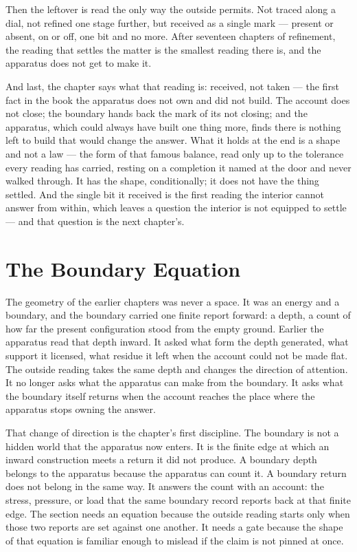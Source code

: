 Then the leftover is read the only way the outside permits. Not traced along a dial, not refined one stage further, but received as a single mark --- present or absent, on or off, one bit and no more. After seventeen chapters of refinement, the reading that settles the matter is the smallest reading there is, and the apparatus does not get to make it.

And last, the chapter says what that reading is: received, not taken --- the first fact in the book the apparatus does not own and did not build. The account does not close; the boundary hands back the mark of its not closing; and the apparatus, which could always have built one thing more, finds there is nothing left to build that would change the answer. What it holds at the end is a shape and not a law --- the form of that famous balance, read only up to the tolerance every reading has carried, resting on a completion it named at the door and never walked through. It has the shape, conditionally; it does not have the thing settled. And the single bit it received is the first reading the interior cannot answer from within, which leaves a question the interior is not equipped to settle --- and that question is the next chapter's.

\section{The Boundary Equation}

The geometry of the earlier chapters was never a space. It was an energy and a boundary, and the
boundary carried one finite report forward: a depth, a count of how far the present configuration
stood from the empty ground. Earlier the apparatus read that depth inward. It asked what form the
depth generated, what support it licensed, what residue it left when the account could not be made
flat. The outside reading takes the same depth and changes the direction of attention. It no
longer asks what the apparatus can make from the boundary. It asks what the boundary itself
returns when the account reaches the place where the apparatus stops owning the answer.

That change of direction is the chapter's first discipline. The boundary is not a hidden world
that the apparatus now enters. It is the finite edge at which an inward construction meets a
return it did not produce. A boundary depth belongs to the apparatus because the apparatus can
count it. A boundary return does not belong in the same way. It answers the count with an account:
the stress, pressure, or load that the same boundary record reports back at that finite edge.
The section needs an equation because the outside reading starts only when those two reports are
set against one another. It needs a gate because the shape of that equation is familiar enough to
mislead if the claim is not pinned at once.

